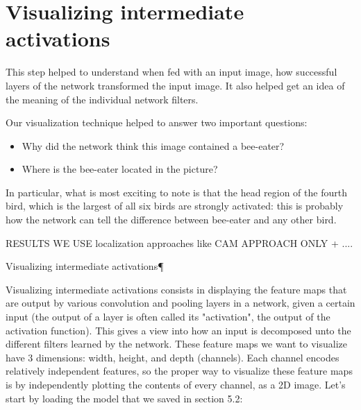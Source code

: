\section*{Visualizing intermediate activations}

This step helped to understand when fed with an input image, how successful layers of the network transformed the input image. It also helped get an idea of the meaning of the individual network filters.

Our visualization technique helped to answer two important questions:

\begin{itemize}
\item  Why did the network think this image contained a bee-eater?
\item Where is the bee-eater located in the picture?
\end{itemize}

In particular, what is most exciting to note is that the head region of the fourth bird, which is the largest of all six birds are strongly activated: this is probably how the network can tell the difference between bee-eater and any other bird.


\iffalse
RESULTS
WE USE localization approaches like CAM APPROACH ONLY + ....

Visualizing intermediate activations¶

Visualizing intermediate activations consists in displaying the feature maps that are output by various convolution and pooling layers in a network, given a certain input (the output of a layer is often called its "activation", the output of the activation function). This gives a view into how an input is decomposed unto the different filters learned by the network. These feature maps we want to visualize have 3 dimensions: width, height, and depth (channels). Each channel encodes relatively independent features, so the proper way to visualize these feature maps is by independently plotting the contents of every channel, as a 2D image. Let's start by loading the model that we saved in section 5.2:

